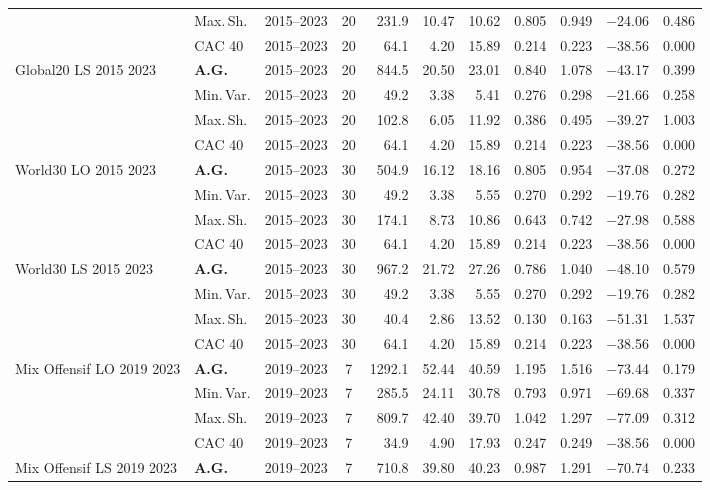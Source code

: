 \begin{longtable}{p{2.6cm} l c c r r r r r r r}
 & Max.\,Sh. & 2015--2023 & 20 & 231.9 & 10.47 & 10.62 & 0.805 & 0.949 & $-$24.06 & 0.486 \\
 & CAC 40 & 2015--2023 & 20 & 64.1 & 4.20 & 15.89 & 0.214 & 0.223 & $-$38.56 & 0.000 \\
\midrule
Global20 LS 2015 2023 & \textbf{A.G.} & 2015--2023 & 20 & 844.5 & 20.50 & 23.01 & 0.840 & 1.078 & $-$43.17 & 0.399 \\
 & Min.\,Var. & 2015--2023 & 20 & 49.2 & 3.38 & 5.41 & 0.276 & 0.298 & $-$21.66 & 0.258 \\
 & Max.\,Sh. & 2015--2023 & 20 & 102.8 & 6.05 & 11.92 & 0.386 & 0.495 & $-$39.27 & 1.003 \\
 & CAC 40 & 2015--2023 & 20 & 64.1 & 4.20 & 15.89 & 0.214 & 0.223 & $-$38.56 & 0.000 \\
\midrule
World30 LO 2015 2023 & \textbf{A.G.} & 2015--2023 & 30 & 504.9 & 16.12 & 18.16 & 0.805 & 0.954 & $-$37.08 & 0.272 \\
 & Min.\,Var. & 2015--2023 & 30 & 49.2 & 3.38 & 5.55 & 0.270 & 0.292 & $-$19.76 & 0.282 \\
 & Max.\,Sh. & 2015--2023 & 30 & 174.1 & 8.73 & 10.86 & 0.643 & 0.742 & $-$27.98 & 0.588 \\
 & CAC 40 & 2015--2023 & 30 & 64.1 & 4.20 & 15.89 & 0.214 & 0.223 & $-$38.56 & 0.000 \\
\midrule
World30 LS 2015 2023 & \textbf{A.G.} & 2015--2023 & 30 & 967.2 & 21.72 & 27.26 & 0.786 & 1.040 & $-$48.10 & 0.579 \\
 & Min.\,Var. & 2015--2023 & 30 & 49.2 & 3.38 & 5.55 & 0.270 & 0.292 & $-$19.76 & 0.282 \\
 & Max.\,Sh. & 2015--2023 & 30 & 40.4 & 2.86 & 13.52 & 0.130 & 0.163 & $-$51.31 & 1.537 \\
 & CAC 40 & 2015--2023 & 30 & 64.1 & 4.20 & 15.89 & 0.214 & 0.223 & $-$38.56 & 0.000 \\
\midrule
Mix Offensif LO 2019 2023 & \textbf{A.G.} & 2019--2023 & 7 & 1292.1 & 52.44 & 40.59 & 1.195 & 1.516 & $-$73.44 & 0.179 \\
 & Min.\,Var. & 2019--2023 & 7 & 285.5 & 24.11 & 30.78 & 0.793 & 0.971 & $-$69.68 & 0.337 \\
 & Max.\,Sh. & 2019--2023 & 7 & 809.7 & 42.40 & 39.70 & 1.042 & 1.297 & $-$77.09 & 0.312 \\
 & CAC 40 & 2019--2023 & 7 & 34.9 & 4.90 & 17.93 & 0.247 & 0.249 & $-$38.56 & 0.000 \\
\midrule
Mix Offensif LS 2019 2023 & \textbf{A.G.} & 2019--2023 & 7 & 710.8 & 39.80 & 40.23 & 0.987 & 1.291 & $-$70.74 & 0.233 \\

\end{longtable}
